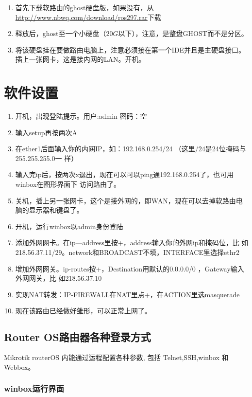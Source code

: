 \begin{enumerate}
\item 首先下载软路由的ghost硬盘版，如果没有，从\url{http://www.nbwq.com/download/ros297.rar}下载
\item 释放后，ghost至一个小硬盘（$20G$以下），注意，是整盘GHOST而不是分区。
\item 将该硬盘挂在要做路由电脑上，注意必须接在第一个IDE并且是主硬盘接口。插上一张网卡，这是接内网的LAN。开机。
\end{enumerate}

\section{软件设置}

\begin{enumerate}
\item 开机，出现登陆提示。用户:admin 密码：空
\item 输入setup再按两次A
\item 在ether1后面输入你的内网IP，如：192.168.0.254/24 （这里/24是24位掩码与255.255.255.0一
  样）
\item 输入完ip后，按两次x退出，现在可以可以ping通192.168.0.254了，也可用winbox在图形界面下
  访问路由了。
\item 关机，插上另一张网卡，这个是接外网的，即WAN，现在可以去掉软路由电脑的显示器和键盘了。
\item 开机，运行winbox以admin身份登陆
\item 添加外网网卡。在ip—address里按+，address输入你的外网ip和掩码位，比
  如218.56.37.11/29。network和BROADCAST不填，INTERFACE里选择ethr2
\item 增加外网网关。ip-routes按+，Destination用默认的0.0.0.0/0 ，Gateway输入外网网关，比
  如218.56.37.10
\item 实现NAT转发：IP-FIREWALL在NAT里点+，在ACTION里选masquerade
\item 现在该路由已经做好雏形，可以正常上网了。
\end{enumerate}

\subsection{Router OS路由器各种登录方式}

Mikrotik routerOS 内能通过运程配置各种参数, 包括 Telnet,SSH,winbox 和
Webbox。

\subsubsection{winbox运行界面}

